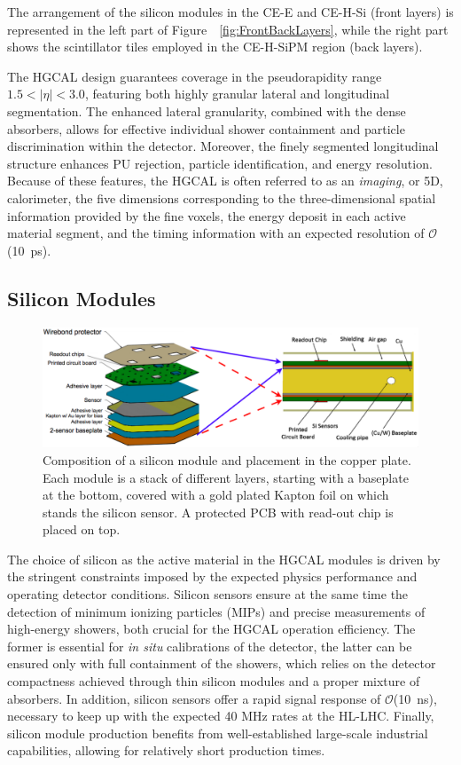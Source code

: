 The arrangement of the silicon modules in the CE-E and CE-H-Si (front layers) is represented in the left part of Figure~~\ref{fig:FrontBackLayers}, while the right part shows the scintillator tiles employed in the CE-H-SiPM region (back layers).

\bigbreak

The HGCAL design guarantees coverage in the pseudorapidity range $1.5 < |\eta| < 3.0$, featuring both highly granular lateral and longitudinal segmentation. 
The enhanced lateral granularity, combined with the dense absorbers, allows for effective individual shower containment and particle discrimination within the detector. Moreover, the finely segmented longitudinal structure enhances PU rejection, particle identification, and energy resolution. Because of these features, the HGCAL is often referred to as an \textit{imaging}, or 5D, calorimeter, the five dimensions corresponding to the three-dimensional spatial information provided by the fine voxels, the energy deposit in each active material segment, and the timing information with an expected resolution of $\mathcal{O}$(10~ps).

\subsection{Silicon Modules}
\label{sec:Silicon Modules}

\begin{figure}
    \centering
    \includegraphics[width=0.9\linewidth]{Figures/HGCAL/ModuleDesign.png}
    \caption{Composition of a silicon module and placement in the copper plate. Each module is a stack of different layers, starting with a baseplate at the bottom, covered with a gold plated Kapton foil on which stands the silicon sensor. A protected PCB with read-out chip is placed on top.}
    \label{fig:ModuleDesign}
\end{figure}

The choice of silicon as the active material in the HGCAL modules is driven by the stringent constraints imposed by the expected physics performance and operating detector conditions. 
Silicon sensors ensure at the same time the detection of minimum ionizing particles (MIPs) and precise measurements of high-energy showers, both crucial for the HGCAL operation efficiency. The former is essential for \textit{in situ} calibrations of the detector, the latter can be ensured only with full containment of the showers, which relies on the detector compactness achieved through thin silicon modules and a proper mixture of absorbers.
In addition, silicon sensors offer a rapid signal response of $\mathcal{O}$(10~ns), necessary to keep up with the expected 40 MHz rates at the HL-LHC. Finally, silicon module production benefits from well-established large-scale industrial capabilities, allowing for relatively short production times.

